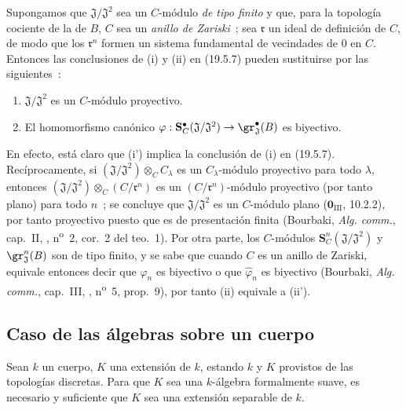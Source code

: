 \begin{remark}[19.5.8]
\label{0.19.5.8-fr}
Supongamos que $\mathfrak J/\mathfrak J^2$ sea un $C$-módulo \emph{de tipo finito} y
que, para la topología cociente de la de $B$, $C$ sea un \emph{anillo de Zariski}~;
sea $\mathfrak r$ un ideal de definición de $C$, de modo que los
$\mathfrak r^n$ formen un sistema fundamental de vecindades de $0$ en $C$.
Entonces las conclusiones de (i) y (ii) en (19.5.7) pueden sustituirse por
las siguientes~:
\begin{enumerate}
  \item[\rm(i')] $\mathfrak J/\mathfrak J^2$ es un $C$-módulo proyectivo.
  \item[\rm(ii')] El homomorfismo canónico
  $\varphi:\mathbf S_C^\bullet(\mathfrak J/\mathfrak J^2)
  \to\gr_{\mathfrak J}^\bullet(B)$ es biyectivo.
\end{enumerate}
En efecto, está claro que (i') implica la conclusión de (i) en (19.5.7).
Recíprocamente, si $(\mathfrak J/\mathfrak J^2)\otimes_C C_\lambda$ es un
$C_\lambda$-módulo proyectivo para todo $\lambda$, entonces
$(\mathfrak J/\mathfrak J^2)\otimes_C(C/\mathfrak r^n)$ es un
$(C/\mathfrak r^n)$-módulo proyectivo (por tanto plano) para todo $n$~; se concluye
que $\mathfrak J/\mathfrak J^2$ es un $C$-módulo plano
($\mathbf 0_{\mathrm{III}}$, 10.2.2), por tanto proyectivo puesto que es de
presentación finita (Bourbaki, \emph{Alg. comm.}, cap.~II, ,
n\textsuperscript{o}~2, cor.~2 del teo.~1). Por otra parte, los $C$-módulos
$\mathbf S_C^n(\mathfrak J/\mathfrak J^2)$ y $\gr_{\mathfrak J}^n(B)$ son
de tipo finito, y se sabe que cuando $C$ es un anillo de Zariski, equivale
entonces decir que $\varphi_n$ es biyectivo o que
$\widehat\varphi_n$ es biyectivo (Bourbaki, \emph{Alg. comm.}, cap.~III,
, n\textsuperscript{o}~5, prop.~9), por tanto (ii) equivale a
(ii').
\end{remark}

\subsection{Caso de las álgebras sobre un cuerpo}
\label{subsection:0.19.6-fr}

\begin{theorem}[19.6.1) (Cohen]
\label{0.19.6.1-fr}
Sean $k$ un cuerpo, $K$ una extensión de $k$, estando $k$ y $K$
provistos de las topologías discretas. Para que $K$ sea una $k$-álgebra
formalmente suave, es necesario y suficiente que $K$ sea una extensión separable
de $k$.
\end{theorem}

